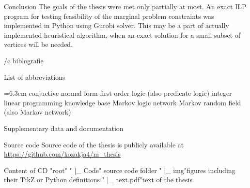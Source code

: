 \chap Conclusion
The goals of the thesis were met only partially at most. An exact ILP program for testing feasibility of the marginal problem constraints was implemented in Python using Gurobi solver. This may be a part of actually implemented heuristical algorithm, when an exact solution for a small subset of vertices will be needed.

\bibchap
\usebbl/c biblografie

\app List of abbreviations
\par 
\medskip
\bgroup \leftskip=6.3em
\abbrv[CNF] conjuctive normal form
\abbrv[FOL] first-order logic (also predicate logic)
\abbrv[ILP] integer linear programming
\abbrv[KB] knowledge base
\abbrv[MLN] Markov logic network
\abbrv[MRF] Markov random field (also Markov network)
\par\egroup

\app Supplementary data and documentation

\sec Source code
Source code of the thesis is publicly available at \url{https://github.com/kozakja4/m_thesis}

\sec Content of CD
"root"\nl
" |_ Code" \tocdotfill source code folder\nl
" |_ img"\tocdotfill figures including their TikZ or Python definitions\nl
" |_ text.pdf"\tocdotfill text of the thesis\nl

\bye